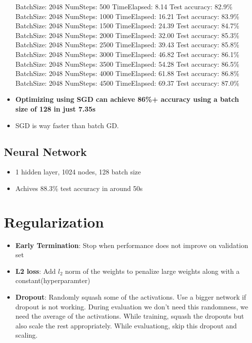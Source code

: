 \documentclass{article}
\begin{document}
\begin{itemize}
BatchSize: 2048 NumSteps: 500 TimeElapsed: 8.14 Test accuracy: 82.9\% \\
BatchSize: 2048 NumSteps: 1000 TimeElapsed: 16.21 Test accuracy: 83.9\% \\
BatchSize: 2048 NumSteps: 1500 TimeElapsed: 24.39 Test accuracy: 84.7\% \\
BatchSize: 2048 NumSteps: 2000 TimeElapsed: 32.00 Test accuracy: 85.3\% \\
BatchSize: 2048 NumSteps: 2500 TimeElapsed: 39.43 Test accuracy: 85.8\% \\
BatchSize: 2048 NumSteps: 3000 TimeElapsed: 46.82 Test accuracy: 86.1\% \\
BatchSize: 2048 NumSteps: 3500 TimeElapsed: 54.28 Test accuracy: 86.5\% \\
BatchSize: 2048 NumSteps: 4000 TimeElapsed: 61.88 Test accuracy: 86.8\% \\
BatchSize: 2048 NumSteps: 4500 TimeElapsed: 69.37 Test accuracy: 87.0\% \\

\item \textbf{Optimizing using SGD can achieve 86\%+ accuracy using a batch size of 128 in just 7.35s}

\item SGD is way faster than batch GD. 

\end{itemize}

\subsection{Neural Network}
\begin{itemize}
	\item 1 hidden layer, 1024 nodes, 128 batch size
	\item Achives 88.3\% test accuracy in around 50s
\end{itemize}

\newpage
\section{Regularization}
\begin{itemize}
	\item \textbf{Early Termination}: Stop when performance does not improve on validation set
	\item \textbf{L2 loss}: Add $l_2$ norm of the weights to penalize large weights along with a constant(hyperparamter)
	\item \textbf{Dropout}: Randomly squash some of the activations. Use a bigger network if dropout is not working. During evaluation we don't need this randomness, we need the average of the activations. While training, squash the dropouts but also scale the rest appropriately. While evaluationg, skip this dropout and scaling.
\end{itemize}
\end{document}

